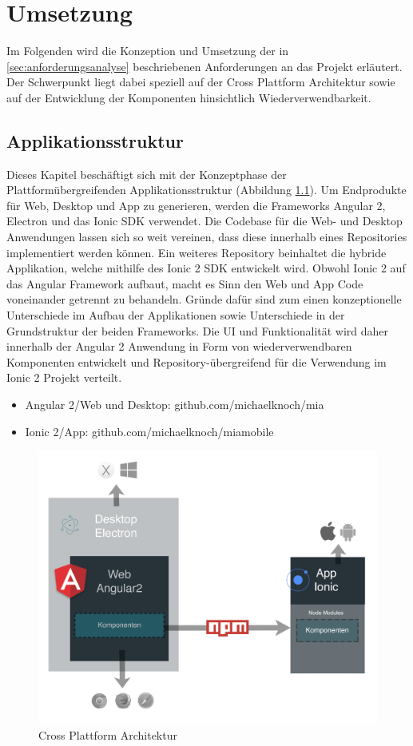 
\chapter{Umsetzung}
\label{chap:umsetzung}

Im Folgenden wird die Konzeption und Umsetzung der in \ref{sec:anforderungsanalyse}
beschriebenen Anforderungen an das Projekt \projectname{} erläutert.
Der Schwerpunkt liegt dabei speziell auf der Cross Plattform Architektur sowie auf der
Entwicklung der Komponenten hinsichtlich Wiederverwendbarkeit.


\section{Applikationsstruktur}

Dieses Kapitel beschäftigt sich mit der Konzeptphase der Plattformübergreifenden Applikationsstruktur
(Abbildung \ref{kapitel4/arch}).
Um Endprodukte für Web, Desktop und App zu generieren, werden die Frameworks Angular 2, Electron und das
Ionic \ac{SDK} verwendet. Die Codebase für die Web- und Desktop Anwendungen lassen sich so weit vereinen,
dass diese innerhalb eines Repositories implementiert werden können.
Ein weiteres Repository beinhaltet die hybride Applikation,
welche mithilfe des Ionic 2 \ac{SDK} entwickelt wird. Obwohl Ionic 2 auf das Angular Framework aufbaut,
macht es Sinn den Web und App Code voneinander getrennt zu behandeln.
Gründe dafür sind zum einen konzeptionelle Unterschiede im Aufbau der Applikationen
sowie Unterschiede in der Grundstruktur der beiden Frameworks.
Die \ac{UI} und Funktionalität wird daher innerhalb der Angular 2
Anwendung in Form von wiederverwendbaren Komponenten entwickelt und
Repository-übergreifend für die Verwendung im Ionic 2 Projekt verteilt.

\begin{itemize}
  \item Angular 2/Web und Desktop: github.com/michaelknoch/mia
  \item Ionic 2/App: github.com/michaelknoch/miamobile
\end{itemize}



\begin{figure}[htbp]
 \centering
 \includegraphics[width=0.55\linewidth]{kapitel4/arch.png}
 \caption{Cross Plattform Architektur}
 \label{kapitel4/arch}
\end{figure}





